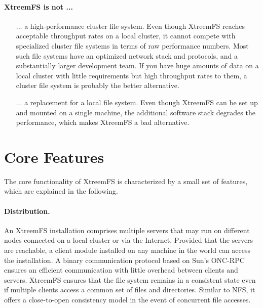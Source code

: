 \documentclass[a4paper,10pt]{book}
\begin{document}
\paragraph{XtreemFS is not ...}
\begin{itemize}
 \item [...] a high-performance cluster file system. Even though XtreemFS reaches acceptable throughput rates on a local cluster, it cannot compete with specialized cluster file systems in terms of raw performance numbers. Most such file systems have an optimized network stack and protocols, and a substantially larger development team. If you have huge amounts of data on a local cluster with little requirements but high throughput rates to them, a cluster file system is probably the better alternative.
 \item [...] a replacement for a local file system. Even though XtreemFS can be set up and mounted on a single machine, the additional software stack degrades the performance, which makes XtreemFS a bad alternative.
\end{itemize}

\section{Core Features}
The core functionality of XtreemFS is characterized by a small set of features, which are explained in the following.

\paragraph{Distribution.}
An XtreemFS installation comprises multiple servers that may run on different nodes connected on a local cluster or via the Internet. Provided that the servers are reachable, a client module installed on any machine in the world can access the installation. A binary communication protocol based on Sun's ONC-RPC ensures an efficient communication with little overhead between clients and servers. XtreemFS ensures that the file system remains in a consistent state even if multiple clients access a common set of files and directories. Similar to NFS, it offers a close-to-open consistency model in the event of concurrent file accesses.
\end{document}
